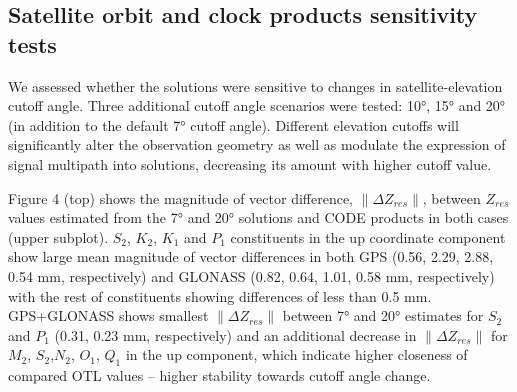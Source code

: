 \documentclass[se, manuscript]{copernicus}
\providecommand{\DIFaddbegin}{} %
\begin{document}
\subsection{Satellite orbit and clock products sensitivity tests}
We assessed whether the solutions were sensitive to changes in satellite-elevation cutoff angle. Three additional cutoff angle scenarios were tested: 10°, 15° and 20° (in addition to the default 7° cutoff angle). Different elevation cutoffs will significantly alter the observation geometry as well as modulate the expression of signal multipath into solutions, decreasing its amount with higher cutoff value.

Figure 4 (top) shows the magnitude of vector difference, $\|\Delta Z_{res}\|$, between $Z_{res}$ values estimated from the 7° and 20° solutions and CODE products in both cases (upper subplot). $S_2$, $K_2$, $K_1$ and $P_1$ constituents in the up coordinate component show large mean magnitude of vector differences in both GPS (0.56, 2.29, 2.88, 0.54 mm, respectively) and GLONASS (0.82, 0.64, 1.01, 0.58 mm, respectively) with the rest of constituents showing differences of less than 0.5 mm. GPS+GLONASS shows smallest $\|\Delta Z_{res}\|$ between 7° and 20° estimates for $S_2$ and $P_1$ (0.31, 0.23 mm, respectively) and an additional decrease in $\|\Delta Z_{res}\|$ for $M_2$, $S_2$,$N_2$, $O_1$, $Q_1$ in the up component, which indicate higher closeness of compared OTL values – higher stability towards cutoff angle change.
\DIFaddbegin 
\end{document}
